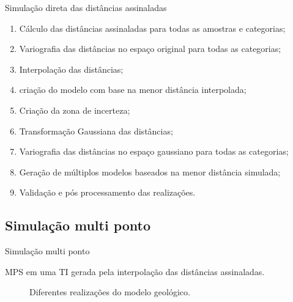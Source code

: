 \documentclass[aspectratio=169]{beamer}
\begin{document}
\begin{frame}{Simulação direta das distâncias assinaladas}
	\begin{enumerate}
		\item Cálculo das distâncias assinaladas para todas as amostras e categorias;
		\item Variografia das distâncias no espaço original para todas as categorias;
		\item Interpolação das distâncias; 
		\item criação do modelo com base na menor distância interpolada;
		\item Criação da zona de incerteza;
		\item Transformação Gaussiana das distâncias;
		\item Variografia das distâncias no espaço gaussiano para todas as categorias;
		\item Geração de múltiplos modelos baseados na menor distância simulada;
		\item Validação e pós processamento das realizações.
	\end{enumerate}
\end{frame}

\subsection{Simulação multi ponto}

\begin{frame}{Simulação multi ponto}

MPS em uma TI gerada pela interpolação das distâncias assinaladas.
	\begin{figure}[H]
		\caption{Diferentes realizações do modelo geológico.} 
		\label{snesim_real}
	\end{figure}
\end{frame}
\end{document}
